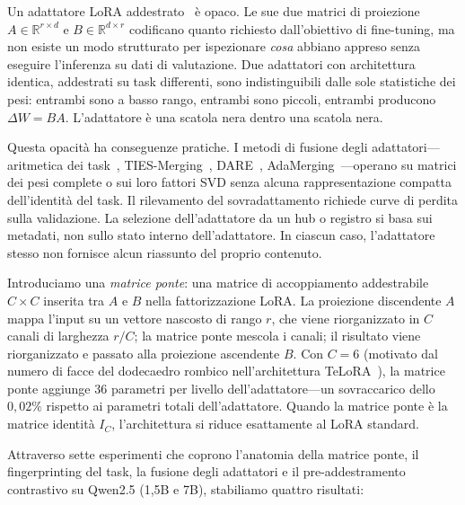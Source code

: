 \documentclass[11pt]{article}
\begin{document}
Un adattatore LoRA addestrato~\cite{hu2022lora} \`e opaco.
Le sue due matrici di proiezione $A \in \mathbb{R}^{r \times d}$ e
$B \in \mathbb{R}^{d \times r}$ codificano quanto richiesto
dall'obiettivo di fine-tuning, ma non esiste un modo strutturato per
ispezionare \emph{cosa} abbiano appreso senza eseguire l'inferenza su
dati di valutazione. Due adattatori con architettura identica, addestrati
su task differenti, sono indistinguibili dalle sole statistiche dei pesi:
entrambi sono a basso rango, entrambi sono piccoli, entrambi producono
$\Delta W = BA$.
L'adattatore \`e una scatola nera dentro una scatola nera.

Questa opacit\`a ha conseguenze pratiche.
I metodi di fusione degli adattatori---aritmetica dei
task~\cite{ilharco2023editing},
TIES-Merging~\cite{yadav2023ties}, DARE~\cite{yu2024dare},
AdaMerging~\cite{yang2024adamerging}---operano su matrici dei pesi
complete o sui loro fattori SVD senza alcuna rappresentazione compatta
dell'identit\`a del task.
Il rilevamento del sovradattamento richiede curve di perdita sulla
validazione.
La selezione dell'adattatore da un hub o registro si basa sui metadati,
non sullo stato interno dell'adattatore.
In ciascun caso, l'adattatore stesso non fornisce alcun riassunto del
proprio contenuto.

Introduciamo una \emph{matrice ponte}: una matrice di accoppiamento
addestrabile $C \times C$ inserita tra $A$ e $B$ nella fattorizzazione
LoRA.
La proiezione discendente $A$ mappa l'input su un vettore nascosto di
rango $r$, che viene riorganizzato in $C$ canali di larghezza $r/C$;
la matrice ponte mescola i canali; il risultato viene riorganizzato e
passato alla proiezione ascendente $B$.
Con $C = 6$ (motivato dal numero di facce del dodecaedro rombico
nell'architettura TeLoRA~\cite{rhombilora_paper1, rhombilora_paper2}),
la matrice ponte aggiunge 36 parametri per livello dell'adattatore---un
sovraccarico dello $0{,}02\%$ rispetto ai parametri totali dell'adattatore.
Quando la matrice ponte \`e la matrice identit\`a $I_C$, l'architettura
si riduce esattamente al LoRA standard.

Attraverso sette esperimenti che coprono l'anatomia della matrice ponte,
il fingerprinting del task, la fusione degli adattatori e il
pre-addestramento contrastivo su Qwen2.5 (1,5B e 7B), stabiliamo
quattro risultati:
\end{document}
